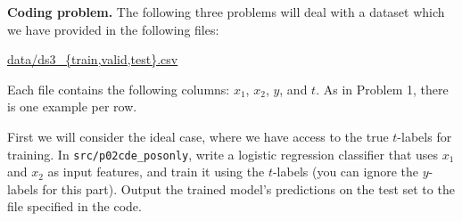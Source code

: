 \clearpage
\item {} \textbf{Coding problem.}
The following three problems will deal with a dataset which we have provided in
the following files:
%
\begin{center}
  \url{data/ds3_{train,valid,test}.csv}
\end{center}
%
Each file contains the following columns: $x_1$, $x_2$, $y$, and $t$. As in
Problem 1, there is one example per row.

First we will consider the ideal case, where we have access to the true
$t$-labels for training. In \texttt{src/p02cde\_posonly}, write a logistic
regression classifier that uses $x_1$ and $x_2$ as input features, and train it
using the $t$-labels (you can ignore the $y$-labels for this part). Output the
trained model's predictions on the test set to the file specified in the code.

\ifnum{} {
  
} \fi

